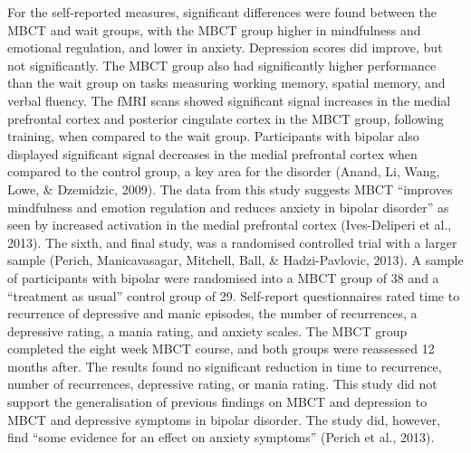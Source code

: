 For the self-reported measures, significant differences were found between the MBCT and wait groups, with the MBCT group higher in mindfulness and emotional regulation, and lower in anxiety. Depression scores did improve, but not significantly. The MBCT group also had significantly higher performance than the wait group on tasks measuring working memory, spatial memory, and verbal fluency. The fMRI scans showed significant signal increases in the medial prefrontal cortex and posterior cingulate cortex in the MBCT group, following training, when compared to the wait group. Participants with bipolar also displayed significant signal decreases in the medial prefrontal cortex when compared to the control group, a key area for the disorder (Anand, Li, Wang, Lowe, & Dzemidzic, 2009). The data from this study suggests MBCT “improves mindfulness and emotion regulation and reduces anxiety in bipolar disorder” as seen by increased activation in the medial prefrontal cortex (Ives-Deliperi et al., 2013).
The sixth, and final study, was a randomised controlled trial with a larger sample (Perich, Manicavasagar, Mitchell, Ball, & Hadzi-Pavlovic, 2013). A sample of participants with bipolar were randomised into a MBCT group of 38 and a “treatment as usual” control group of 29. Self-report questionnaires rated time to recurrence of depressive and manic episodes, the number of recurrences, a depressive rating, a mania rating, and anxiety scales. The MBCT group completed the eight week MBCT course, and both groups were reassessed 12 months after. The results found no significant reduction in time to recurrence, number of recurrences, depressive rating, or mania rating. This study did not support the generalisation of previous findings on MBCT and depression to MBCT and depressive symptoms in bipolar disorder. The study did, however, find “some evidence for an effect on anxiety symptoms” (Perich et al., 2013).
  